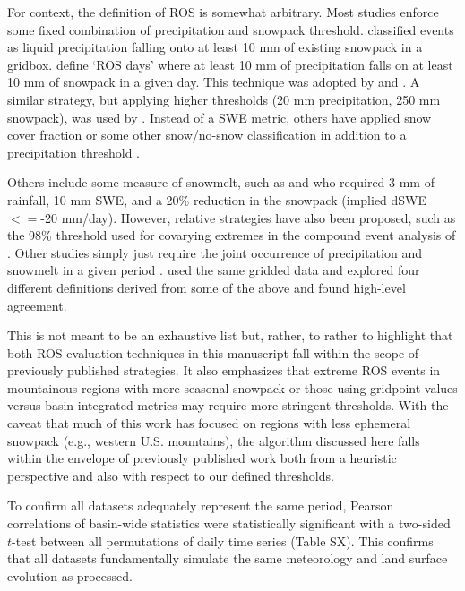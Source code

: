 \documentclass[nhess, manuscript]{copernicus}
\begin{document}
For context, the definition of ROS is somewhat arbitrary. Most studies enforce some fixed combination of precipitation and snowpack threshold. \citet{ye2008winter} classified events as liquid precipitation falling onto at least 10 mm of existing snowpack in a gridbox. \citet{musselman2018projected} define `ROS days' where at least 10 mm of precipitation falls on at least 10 mm of snowpack in a given day. This technique was adopted by \citet{lopez2021changes} and \citet{maina2023diverging}. A similar strategy, but applying higher thresholds (20 mm precipitation, 250 mm snowpack), was used by \citet{wurzer2016influence}. Instead of a SWE metric, others have applied snow cover fraction or some other snow/no-snow classification in addition to a precipitation threshold \citep{mazurkiewicz2008assessing,pradhanang2013rain,cohen2015trends}.

Others include some measure of snowmelt, such as \citet{freudiger2014large} and \citet{li2019the} who required 3 mm of rainfall, 10 mm SWE, and a 20\% reduction in the snowpack (implied dSWE $<=$-20 mm/day). However, relative strategies have also been proposed, such as the 98\% threshold used for covarying extremes in the compound event analysis of \citet{poschlod2020climate}. Other studies simply just require the joint occurrence of precipitation and snowmelt in a given period \citep{mccabe2007rain,surfleet2013variability,collins2014annual,guan2016hydrometeorological,jeong2018rain}. \citet{wachowicz2020rain} used the same gridded data and explored four different definitions derived from some of the above and found high-level agreement.

This is not meant to be an exhaustive list but, rather, to rather to highlight that both ROS evaluation techniques in this manuscript fall within the scope of previously published strategies. It also emphasizes that extreme ROS events in mountainous regions with more seasonal snowpack or those using gridpoint values versus basin-integrated metrics may require more stringent thresholds. With the caveat that much of this work has focused on regions with less ephemeral snowpack (e.g., western U.S. mountains), the algorithm discussed here falls within the envelope of previously published work both from a heuristic perspective and also with respect to our defined thresholds.

To confirm all datasets adequately represent the same period, Pearson correlations of basin-wide statistics were statistically significant with a two-sided $t$-test between all permutations of daily time series (Table SX). This confirms that all datasets fundamentally simulate the same meteorology and land surface evolution as processed.
\end{document}
